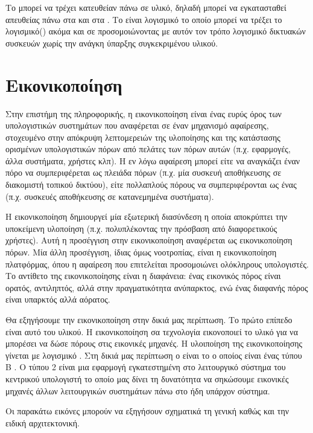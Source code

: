 Το  μπορεί να τρέχει κατευθείαν πάνω σε υλικό, δηλαδή μπορεί 
να εγκατασταθεί απευθείας πάνω στα  και στα  . 
Το  είναι λογισμικό το οποίο μπορεί να τρέξει το λογισμικό()
ακόμα και σε  προσομοιώνοντας με αυτόν τον τρόπο λογισμικό 
δικτυακών συσκευών χωρίς την ανάγκη ύπαρξης συγκεκριμένου υλικού.


\section{Εικονικοποίηση}
Στην επιστήμη της πληροφορικής, η εικονικοποίηση  είναι ένας ευρύς όρος 
των υπολογιστικών συστημάτων που αναφέρεται σε έναν μηχανισμό αφαίρεσης, 
στοχευμένο στην απόκρυψη λεπτομερειών της υλοποίησης και της κατάστασης
ορισμένων υπολογιστικών πόρων από πελάτες των πόρων αυτών 
(π.χ. εφαρμογές, άλλα συστήματα, χρήστες κλπ). 
Η εν λόγω αφαίρεση μπορεί είτε να αναγκάζει έναν πόρο να 
συμπεριφέρεται ως πλειάδα πόρων (π.χ. μία συσκευή αποθήκευσης σε διακομιστή τοπικού δικτύου),
είτε πολλαπλούς πόρους να συμπεριφέρονται ως ένας (π.χ. συσκευές αποθήκευσης σε κατανεμημένα συστήματα). 

Η εικονικοποίηση δημιουργεί μία εξωτερική διασύνδεση η οποία αποκρύπτει την 
υποκείμενη υλοποίηση (π.χ. πολυπλέκοντας την πρόσβαση από διαφορετικούς χρήστες).
Αυτή η προσέγγιση στην εικονικοποίηση αναφέρεται ως εικονικοποίηση πόρων. 
Μία άλλη προσέγγιση, ίδιας όμως νοοτροπίας, είναι η εικονικοποίηση πλατφόρμας,
όπου η αφαίρεση που επιτελείται προσομοιώνει ολόκληρους υπολογιστές. Το αντίθετο της εικονικοποίησης είναι η διαφάνεια: 
ένας εικονικός πόρος είναι ορατός, αντιληπτός, αλλά στην πραγματικότητα ανύπαρκτος, 
ενώ ένας διαφανής πόρος είναι υπαρκτός αλλά αόρατος. 
 
Θα εξηγήσουμε την εικονικοποίηση στην δικιά μας περίπτωση. Το πρώτο επίπεδο είναι αυτό του υλικού. Η εικονικοποίηση
σα τεχνολογία εικονοποιεί το υλικό για να μπορέσει να δώσε πόρους στις εικονικές μηχανές. Η υλοιποίηση
της εικονικοποίησης γίνεται με λογισμικό . Στη δικιά μας περίπτωση ο  είναι 
το  ο οποίος είναι ένας τύπου Β . Ο  τύπου 2 είναι μια εφαρμογή εγκατεστημένη 
στο λειτουργικό σύστημα του κεντρικού υπολογιστή το οποίο μας δίνει τη δυνατότητα να σηκώσουμε 
εικονικές μηχανές άλλων λειτουργικών συστημάτων πάνω στο ήδη υπάρχον σύστημα.

Οι παρακάτω εικόνες μπορούν να εξηγήσουν σχηματικά τη γενική καθώς και την ειδική αρχιτεκτονική.

